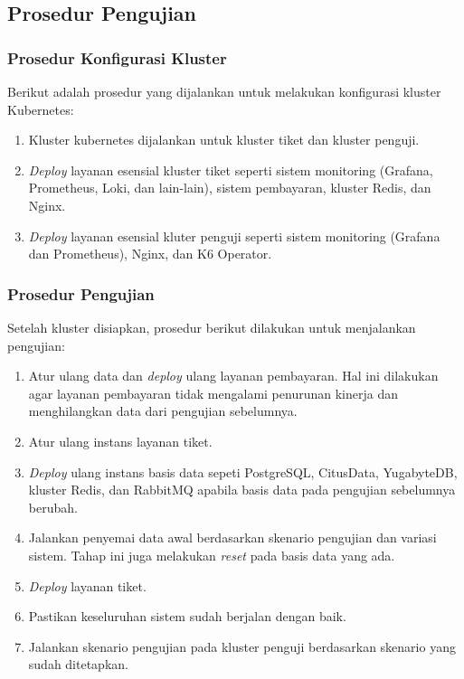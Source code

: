 \subsection{Prosedur Pengujian}

\subsubsection{Prosedur Konfigurasi Kluster}

Berikut adalah prosedur yang dijalankan untuk melakukan konfigurasi kluster Kubernetes:

\begin{enumerate}
    \item Kluster kubernetes dijalankan untuk kluster tiket dan kluster penguji.
    \item \textit{Deploy} layanan esensial kluster tiket seperti sistem monitoring (Grafana, Prometheus, Loki, dan lain-lain), sistem pembayaran, kluster Redis, dan Nginx.
    \item \textit{Deploy} layanan esensial kluter penguji seperti sistem monitoring (Grafana dan Prometheus), Nginx, dan K6 Operator.
\end{enumerate}

\subsubsection{Prosedur Pengujian}

Setelah kluster disiapkan, prosedur berikut dilakukan untuk menjalankan pengujian:

\begin{enumerate}
    \item Atur ulang data dan \textit{deploy} ulang layanan pembayaran. Hal ini dilakukan agar layanan pembayaran tidak mengalami penurunan kinerja dan menghilangkan data dari pengujian sebelumnya.
    \item Atur ulang instans layanan tiket.
    \item \textit{Deploy} ulang instans basis data sepeti PostgreSQL, CitusData, YugabyteDB, kluster Redis, dan RabbitMQ apabila basis data pada pengujian sebelumnya berubah.
    \item Jalankan penyemai data awal berdasarkan skenario pengujian dan variasi sistem. Tahap ini juga melakukan \textit{reset} pada basis data yang ada.
    \item \textit{Deploy} layanan tiket.
    \item Pastikan keseluruhan sistem sudah berjalan dengan baik.
    \item Jalankan skenario pengujian pada kluster penguji berdasarkan skenario yang sudah ditetapkan.
\end{enumerate}

